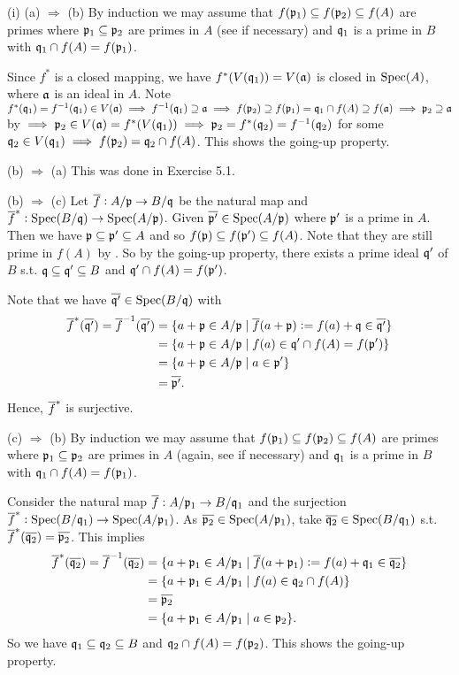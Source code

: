 \documentclass[../A&M.tex]{subfiles}
\begin{document}
(i) (a) $\Rightarrow$ (b) By induction we may assume that $f(\mathfrak{p}_1) \subseteq f(\mathfrak{p}_2) \subseteq f(A)$ are primes where $\mathfrak{p}_1 \subseteq \mathfrak{p}_2$ are primes in $A$ (see  if necessary) and $\mathfrak{q}_1$ is a prime in $B$ with $\mathfrak{q}_1 \cap f(A) = f(\mathfrak{p}_1)$.

Since $f^*$ is a closed mapping, we have $f^*(V(\mathfrak{q}_1)) = V(\mathfrak{a})$ is closed in $\operatorname{Spec}(A)$, where $\mathfrak{a}$ is an ideal in $A$. Note $f^*(\mathfrak{q}_1) = f^{-1}(\mathfrak{q}_1)\in V(\mathfrak{a}) \implies f^{-1}(\mathfrak{q}_1) \supseteq \mathfrak{a} \implies f(\mathfrak{p}_2) \supseteq f(\mathfrak{p}_1) = \mathfrak{q}_1 \cap f(A) \supseteq f(\mathfrak{a}) \implies \mathfrak{p}_2 \supseteq \mathfrak{a}$ by  $\implies \mathfrak{p}_2 \in V(\mathfrak{a}) = f^*(V(\mathfrak{q}_1)) \implies \mathfrak{p}_2 = f^*(\mathfrak{q}_2) = f^{-1}(\mathfrak{q}_2)$ for some $\mathfrak{q}_2 \in V(\mathfrak{q}_1) \implies f(\mathfrak{p}_2) = \mathfrak{q}_2 \cap f(A)$. This shows the going-up property.

(b) $\Rightarrow$ (a) This was done in Exercise 5.1.

(b) $\Rightarrow$ (c) Let $\overline{f}: A/\mathfrak{p} \to B/\mathfrak{q}$ be the natural map and $\overline{f}^*:\operatorname{Spec}(B/\mathfrak{q})\to\operatorname{Spec}(A/\mathfrak{p})$. Given $\overline{\mathfrak{p}'} \in \operatorname{Spec}(A/\mathfrak{p})$ where $\mathfrak{p}'$ is a prime in $A$. Then we have $\mathfrak{p} \subseteq \mathfrak{p}' \subseteq A$ and so $f(\mathfrak{p}) \subseteq f(\mathfrak{p}') \subseteq f(A)$. Note that they are still prime in $f(A)$ by . So by the going-up property, there exists a prime ideal $\mathfrak{q}'$ of $B$ s.t. $\mathfrak{q} \subseteq \mathfrak{q}' \subseteq B$ and $\mathfrak{q}' \cap f(A) = f(\mathfrak{p}')$.

Note that we have $\overline{\mathfrak{q}'} \in \operatorname{Spec}(B/\mathfrak{q})$ with
\begin{align*}
\overline{f}^*(\overline{\mathfrak{q}'}) = \overline{f}^{-1}(\overline{\mathfrak{q}'}) 
&= \{ a+\mathfrak{p} \in A/\mathfrak{p} \mid \overline{f}(a+\mathfrak{p}) := f(a)+\mathfrak{q} \in \overline{\mathfrak{q}'}\}   \\
&= \{ a+\mathfrak{p} \in A/\mathfrak{p} \mid f(a) \in \mathfrak{q}'\cap f(A) = f(\mathfrak{p}') \}     \\
&= \{ a+\mathfrak{p} \in A/\mathfrak{p} \mid a\in \mathfrak{p}' \}   \\
&= \overline{\mathfrak{p}'}.
\end{align*}
Hence, $\overline{f}^*$ is surjective.

(c) $\Rightarrow$ (b) By induction we may assume that $f(\mathfrak{p}_1) \subseteq f(\mathfrak{p}_2) \subseteq f(A)$ are primes where $\mathfrak{p}_1 \subseteq \mathfrak{p}_2$ are primes in $A$ (again, see  if necessary) and $\mathfrak{q}_1$ is a prime in $B$ with $\mathfrak{q}_1 \cap f(A) = f(\mathfrak{p}_1)$.

Consider the natural map $\overline{f}: A/\mathfrak{p}_1 \to B/\mathfrak{q}_1$ and the surjection $\overline{f}^*:\operatorname{Spec}(B/\mathfrak{q}_1)\to\operatorname{Spec}(A/\mathfrak{p}_1)$. As $\overline{\mathfrak{p}_2} \in \operatorname{Spec}(A/\mathfrak{p}_1)$, take $\overline{\mathfrak{q}_2} \in \operatorname{Spec}(B/\mathfrak{q}_1)$ s.t. $\overline{f}^*(\overline{\mathfrak{q}_2}) = \overline{\mathfrak{p}_2}$. This implies
\begin{align*}
\overline{f}^*(\overline{\mathfrak{q}_2}) = \overline{f}^{-1}(\overline{\mathfrak{q}_2}) 
&= \{ a+\mathfrak{p}_1 \in A/\mathfrak{p}_1 \mid \overline{f}(a+\mathfrak{p}_1) := f(a)+\mathfrak{q}_1 \in \overline{\mathfrak{q}_2}\}   \\
&= \{ a+\mathfrak{p}_1 \in A/\mathfrak{p}_1 \mid f(a) \in \mathfrak{q}_2 \cap f(A) \}     \\
&= \overline{\mathfrak{p}_2}   \\
&= \{ a+\mathfrak{p}_1 \in A/\mathfrak{p}_1 \mid a \in \mathfrak{p}_2\}.
\end{align*}
So we have $\mathfrak{q}_1 \subseteq \mathfrak{q}_2 \subseteq B$ and $\mathfrak{q}_2 \cap f(A) = f(\mathfrak{p}_2)$. This shows the going-up property.
\end{document}

